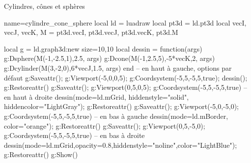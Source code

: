 \begin{demo}{Cylindres, cônes et sphères}
\begin{luadraw}{name=cylindre_cone_sphere}
local ld = luadraw
local pt3d = ld.pt3d
local vecI, vecJ, vecK, M = pt3d.vecI, pt3d.vecJ, pt3d.vecK, pt3d.M

local g = ld.graph3d:new{ size={10,10} }
local dessin = function(args)
    g:Dsphere(M(-1,-2.5,1),2.5, args)
    g:Dcone(M(-1,2.5,5),-5*vecK,2, args)
    g:Dcylinder(M(3,-2,0),6*vecJ,1.5, args)
end
-- en haut à gauche, options par défaut
g:Saveattr(); g:Viewport(-5,0,0,5); g:Coordsystem(-5,5,-5,5,true); dessin(); g:Restoreattr()
g:Saveattr(); g:Viewport(0,5,0,5); g:Coordsystem(-5,5,-5,5,true) -- en haut à droite
dessin({mode=ld.mGrid, hiddenstyle="solid", hiddencolor="LightGray"}); g:Restoreattr()
g:Saveattr(); g:Viewport(-5,0,-5,0); g:Coordsystem(-5,5,-5,5,true) -- en bas à gauche
dessin({mode=ld.mBorder, color="orange"}); g:Restoreattr()
g:Saveattr(); g:Viewport(0,5,-5,0); g:Coordsystem(-5,5,-5,5,true) -- en bas à droite
dessin({mode=ld.mGrid,opacity=0.8,hiddenstyle="noline",color="LightBlue"}); g:Restoreattr()
g:Show()
\end{luadraw}
\end{demo}
